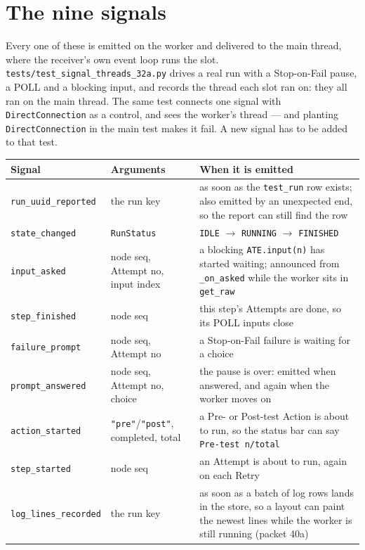 \section{The nine signals}

Every one of these is emitted on the worker and delivered to the main thread, where the receiver's own
event loop runs the slot. \texttt{tests/\allowbreak{}test\_\allowbreak{}signal\_\allowbreak{}threads\_\allowbreak32a.py} drives a real run with a
Stop-on-Fail pause, a POLL and a blocking input, and records the thread each slot ran on: they all ran
on the main thread. The same test connects one signal with \texttt{DirectConnection} as a control, and
sees the worker's thread --- and planting \texttt{DirectConnection} in the main test makes it fail. A
new signal has to be added to that test.

\begingroup\small
\begin{longtable}{p{3.3cm} p{3.6cm} p{5.2cm}}
\toprule
\textbf{Signal} & \textbf{Arguments} & \textbf{When it is emitted} \\
\midrule
\endhead
\texttt{run\_uuid\_reported} & the run key & as soon as the \texttt{test\_run} row exists; also emitted
  by an unexpected end, so the report can still find the row \\
\texttt{state\_changed} & \texttt{RunStatus} & \texttt{IDLE} $\to$ \texttt{RUNNING} $\to$ \texttt{FINISHED} \\
\texttt{input\_asked} & node seq, Attempt no, input index & a blocking \texttt{ATE.input(n)} has started
  waiting; announced from \texttt{\_on\_asked} while the worker sits in \texttt{get\_raw} \\
\texttt{step\_finished} & node seq & this step's Attempts are done, so its POLL inputs close \\
\texttt{failure\_prompt} & node seq, Attempt no & a Stop-on-Fail failure is waiting for a choice \\
\texttt{prompt\_answered} & node seq, Attempt no, choice & the pause is over: emitted when answered, and
  again when the worker moves on \\
\texttt{action\_started} & \texttt{"pre"}/\texttt{"post"}, completed, total & a Pre- or Post-test Action
  is about to run, so the status bar can say \texttt{Pre-test n/total} \\
\texttt{step\_started} & node seq & an Attempt is about to run, again on each Retry \\
\texttt{log\_lines\_recorded} & the run key & as soon as a batch of log rows lands in the store, so a
  layout can paint the newest lines while the worker is still running (packet 40a) \\
\bottomrule
\end{longtable}
\endgroup

